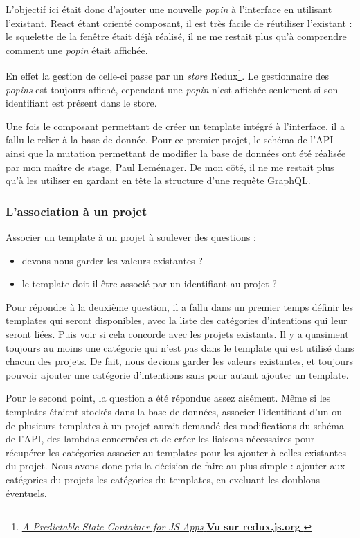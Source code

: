 \documentclass[12pt,a4paper,oneside]{scrreprt}
\begin{document}
L'objectif ici était donc d'ajouter une nouvelle \textit{popin} à l'interface en utilisant l'existant. React étant orienté composant, il est très facile de réutiliser l'existant : le squelette de la fenêtre était déjà réalisé, il ne me restait plus qu'à comprendre comment une \textit{popin} était affichée.

En effet la gestion de celle-ci passe par un \textit{store} Redux\footnote{\href{https://redux.js.org}{\og\textit{A Predictable State Container for JS Apps}\fg{} \textbf{Vu sur redux.js.org} }}. Le gestionnaire des \textit{popins} est toujours affiché, cependant une \textit{popin} n'est affichée seulement si son identifiant est présent dans le store.

Une fois le composant permettant de créer un template intégré à l'interface, il a fallu le relier à la base de donnée. Pour ce premier projet, le schéma de l'API ainsi que la mutation permettant de modifier la base de données ont été réalisée par mon maître de stage, Paul Leménager. De mon côté, il ne me restait plus qu'à les utiliser en gardant en tête la structure d'une requête GraphQL.

\subsubsection{L'association à un projet}

Associer un template à un projet à soulever des questions :
\begin{itemize}
	\item devons nous garder les valeurs existantes ?
	\item le template doit-il être associé par un identifiant au projet ?
\end{itemize}

Pour répondre à la deuxième question, il a fallu dans un premier temps définir les templates qui seront disponibles, avec la liste des catégories d'intentions qui leur seront liées. Puis voir si cela concorde avec les projets existants. Il y a quasiment toujours au moins une catégorie qui n'est pas dans le template qui est utilisé dans chacun des projets. De fait, nous devions garder les valeurs existantes, et toujours pouvoir ajouter une catégorie d'intentions sans pour autant ajouter un template.

Pour le second point, la question a été répondue assez aisément. Même si les templates étaient stockés dans la base de données, associer l'identifiant d'un ou de plusieurs templates à un projet aurait demandé des modifications du schéma de l'API, des lambdas concernées et de créer les liaisons nécessaires pour récupérer les catégories associer au templates pour les ajouter à celles existantes du projet. Nous avons donc pris la décision de faire au plus simple : ajouter aux catégories du projets les catégories du templates, en excluant les doublons éventuels.
\end{document}
